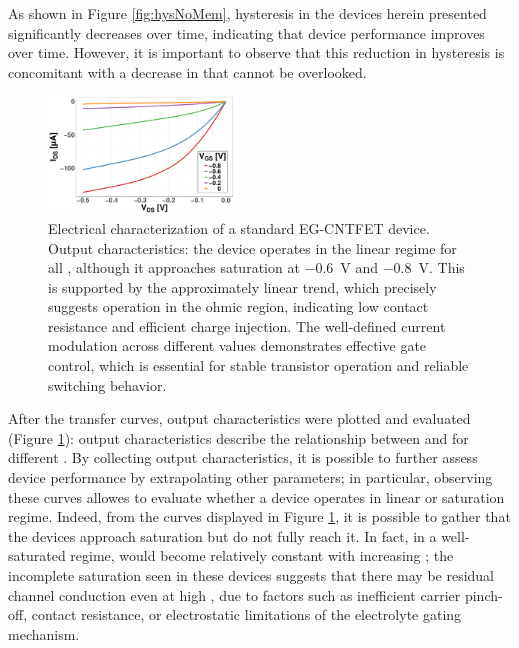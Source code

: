 As shown in Figure \ref{fig:hysNoMem}, hysteresis in the devices herein presented significantly decreases over time, indicating that device performance improves over time. However, it is important to observe that this reduction in hysteresis is concomitant with a decrease in \ids{} that cannot be overlooked.


\begin{figure}[hb]
    \centering
    \includegraphics[width=0.45\textwidth]{figures/chapter3/EGFET/outputNoMem.pdf}
    \caption{Electrical characterization of a standard EG-CNTFET device. Output characteristics: the device operates in the linear regime for all \vds{}, although it approaches saturation at \SI{-0.6}{\V} and \SI{-0.8}{\V}. This is supported by the approximately linear trend, which precisely suggests operation in the ohmic region, indicating low contact resistance and efficient charge injection. The well-defined current modulation across different \vgs{} values demonstrates effective gate control, which is essential for stable transistor operation and reliable switching behavior.}
    \label{fig:outputNoMem}
\end{figure}

After the transfer curves, output characteristics were plotted and evaluated (Figure \ref{fig:outputNoMem}): output characteristics describe the relationship between \ids{} and \vds{} for different \vgs{}. By collecting output characteristics, it is possible to further assess device performance by extrapolating other parameters; in particular, observing these curves allowes to evaluate whether a device operates in linear or saturation regime. Indeed, from the curves displayed in Figure \ref{fig:outputNoMem}, it is possible to gather that the devices approach saturation but do not fully reach it. In fact, in a well-saturated regime, \ids{} would become relatively constant with increasing \vds{}; the incomplete saturation seen in these devices suggests that there may be residual channel conduction even at high \vds{}, due to factors such as inefficient carrier pinch-off, contact resistance, or electrostatic limitations of the electrolyte gating mechanism.

